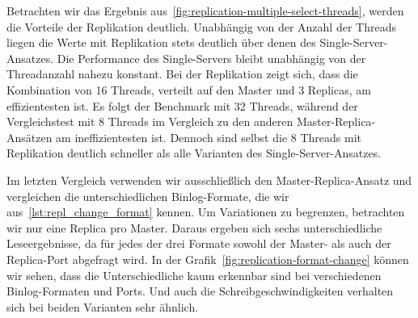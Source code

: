 Betrachten wir das Ergebnis aus~\ref{fig:replication-multiple-select-threads}, werden die Vorteile der Replikation deutlich.
Unabhängig von der Anzahl der Threads liegen die Werte mit Replikation stets deutlich über denen des Single-Server-Ansatzes.
Die Performance des Single-Servers bleibt unabhängig von der Threadanzahl nahezu konstant.
Bei der Replikation zeigt sich, dass die Kombination von 16 Threads, verteilt auf den Master und 3 Replicas, am effizientesten ist.
Es folgt der Benchmark mit 32 Threads, während der Vergleichstest mit 8 Threads im Vergleich zu den anderen Master-Replica-Ansätzen am ineffizientesten ist.
Dennoch sind selbst die 8 Threads mit Replikation deutlich schneller als alle Varianten des Single-Server-Ansatzes.

Im letzten Vergleich verwenden wir ausschließlich den Master-Replica-Ansatz und vergleichen die unterschiedlichen Binlog-Formate, die wir aus~\ref{lst:repl_change_format} kennen.
Um Variationen zu begrenzen, betrachten wir nur eine Replica pro Master.
Daraus ergeben sich sechs unterschiedliche Leseergebnisse, da für jedes der drei Formate sowohl der Master- als auch der Replica-Port abgefragt wird.
In der Grafik~\ref{fig:replication-format-change} können wir sehen, dass die Unterschiedliche kaum erkennbar sind bei verschiedenen Binlog-Formaten und Ports.
Und auch die Schreibgeschwindigkeiten verhalten sich bei beiden Varianten sehr ähnlich.

